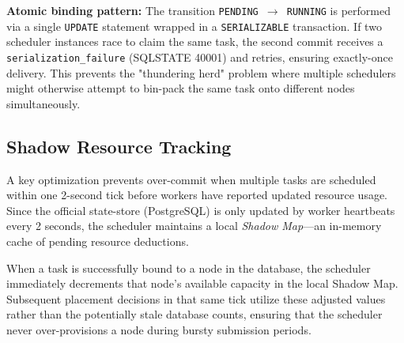 \documentclass[11pt,a4paper]{article}
\begin{document}
\textbf{Atomic binding pattern:} The transition \texttt{PENDING~$\to$~RUNNING} is performed
via a single \texttt{UPDATE} statement wrapped in a \texttt{SERIALIZABLE} transaction.
If two scheduler instances race to claim the same task, the second commit receives a
\texttt{serialization\_failure} (SQLSTATE 40001) and retries, ensuring exactly-once delivery.
This prevents the "thundering herd" problem where multiple schedulers might otherwise 
attempt to bin-pack the same task onto different nodes simultaneously.

\subsection{Shadow Resource Tracking}

A key optimization prevents over-commit when multiple tasks are scheduled within one 2-second
tick before workers have reported updated resource usage. Since the official state-store 
(PostgreSQL) is only updated by worker heartbeats every 2 seconds, the scheduler maintains 
a local \textit{Shadow Map}—an in-memory cache of pending resource deductions. 

When a task is successfully bound to a node in the database, the scheduler immediately 
decrements that node's available capacity in the local Shadow Map. Subsequent placement 
decisions in that same tick utilize these adjusted values rather than the potentially 
stale database counts, ensuring that the scheduler never over-provisions a node during 
bursty submission periods.
\end{document}
